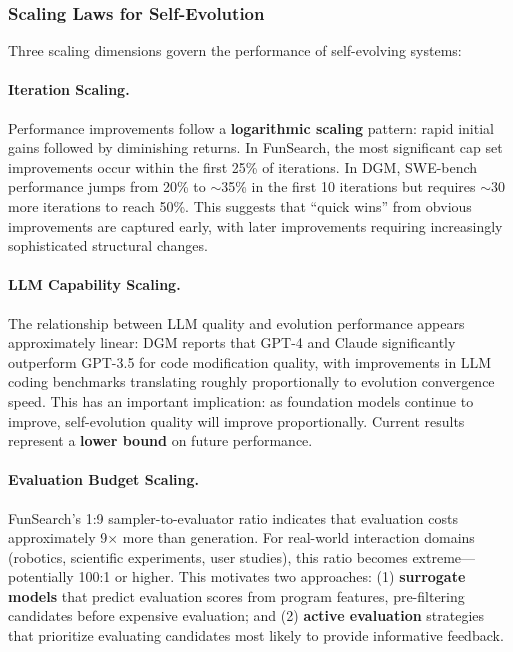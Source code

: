 \subsubsection{Scaling Laws for Self-Evolution}

Three scaling dimensions govern the performance of self-evolving systems:

\paragraph{Iteration Scaling.}
Performance improvements follow a \textbf{logarithmic scaling} pattern: rapid initial gains followed by diminishing returns. In FunSearch, the most significant cap set improvements occur within the first 25\% of iterations. In DGM, SWE-bench performance jumps from 20\% to $\sim$35\% in the first 10 iterations but requires $\sim$30 more iterations to reach 50\%. This suggests that ``quick wins'' from obvious improvements are captured early, with later improvements requiring increasingly sophisticated structural changes.

\paragraph{LLM Capability Scaling.}
The relationship between LLM quality and evolution performance appears approximately linear: DGM reports that GPT-4 and Claude significantly outperform GPT-3.5 for code modification quality, with improvements in LLM coding benchmarks translating roughly proportionally to evolution convergence speed. This has an important implication: as foundation models continue to improve, self-evolution quality will improve proportionally. Current results represent a \textbf{lower bound} on future performance.

\paragraph{Evaluation Budget Scaling.}
FunSearch's 1:9 sampler-to-evaluator ratio indicates that evaluation costs approximately 9$\times$ more than generation. For real-world interaction domains (robotics, scientific experiments, user studies), this ratio becomes extreme---potentially 100:1 or higher. This motivates two approaches: (1) \textbf{surrogate models} that predict evaluation scores from program features, pre-filtering candidates before expensive evaluation; and (2) \textbf{active evaluation} strategies that prioritize evaluating candidates most likely to provide informative feedback.


